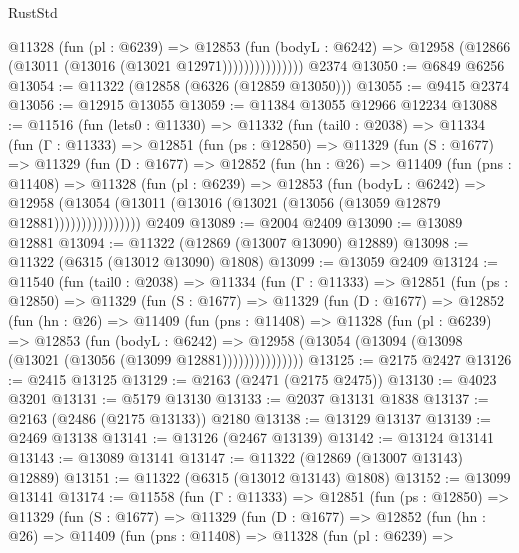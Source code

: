 \begin{lexlean}{RustStd}
\begin{coremodule}
                    @11328
                      (fun (pl : @6239) =>
                      @12853
                        (fun (bodyL : @6242) =>
                        @12958 (@12866 (@13011 (@13016 (@13021 @12971)))))))))))))))
    @2374
@13050 := @6849 @6256
@13054 := @11322 (@12858 (@6326 (@12859 @13050)))
@13055 := @9415 @2374
@13056 := @12915 @13055
@13059 := @11384 @13055 @12966 @12234
@13088 := @11516
    (fun (lets0 : @11330) =>
    @11332
      (fun (tail0 : @2038) =>
      @11334
        (fun (Γ : @11333) =>
        @12851
          (fun (ps : @12850) =>
          @11329
            (fun (S : @1677) =>
            @11329
              (fun (D : @1677) =>
              @12852
                (fun (hn : @26) =>
                @11409
                  (fun (pns : @11408) =>
                  @11328
                    (fun (pl : @6239) =>
                    @12853
                      (fun (bodyL : @6242) =>
                      @12958
                        (@13054
                          (@13011 (@13016 (@13021 (@13056 (@13059 @12879 @12881))))))))))))))))
    @2409
@13089 := @2004 @2409
@13090 := @13089 @12881
@13094 := @11322 (@12869 (@13007 @13090) @12889)
@13098 := @11322 (@6315 (@13012 @13090) @1808)
@13099 := @13059 @2409
@13124 := @11540
    (fun (tail0 : @2038) =>
    @11334
      (fun (Γ : @11333) =>
      @12851
        (fun (ps : @12850) =>
        @11329
          (fun (S : @1677) =>
          @11329
            (fun (D : @1677) =>
            @12852
              (fun (hn : @26) =>
              @11409
                (fun (pns : @11408) =>
                @11328
                  (fun (pl : @6239) =>
                  @12853
                    (fun (bodyL : @6242) =>
                    @12958 (@13054 (@13094 (@13098 (@13021 (@13056 (@13099 @12881)))))))))))))))
@13125 := @2175 @2427
@13126 := @2415 @13125
@13129 := @2163 (@2471 (@2175 @2475))
@13130 := @4023 @3201
@13131 := @5179 @13130
@13133 := @2037 @13131 @1838
@13137 := @2163 (@2486 (@2175 @13133)) @2180
@13138 := @13129 @13137
@13139 := @2469 @13138
@13141 := @13126 (@2467 @13139)
@13142 := @13124 @13141
@13143 := @13089 @13141
@13147 := @11322 (@12869 (@13007 @13143) @12889)
@13151 := @11322 (@6315 (@13012 @13143) @1808)
@13152 := @13099 @13141
@13174 := @11558
    (fun (Γ : @11333) =>
    @12851
      (fun (ps : @12850) =>
      @11329
        (fun (S : @1677) =>
        @11329
          (fun (D : @1677) =>
          @12852
            (fun (hn : @26) =>
            @11409
              (fun (pns : @11408) =>
              @11328
                (fun (pl : @6239) =>

\end{coremodule}
\end{lexlean}
